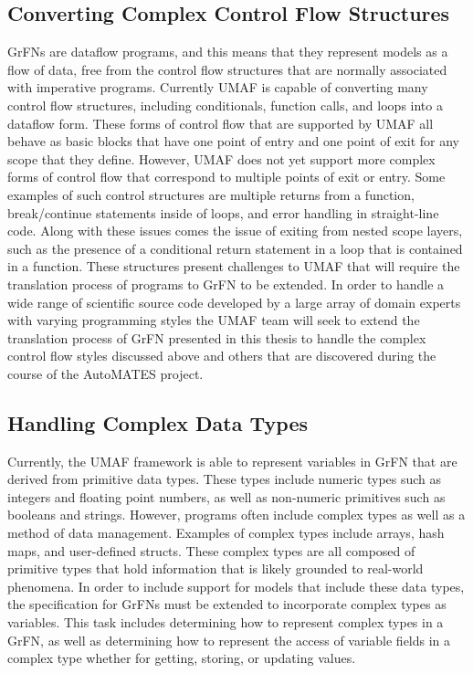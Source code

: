 \subsection{Converting Complex Control Flow Structures\label{sec:early_exit}}
GrFNs are dataflow programs, and this means that they represent models as a flow of data, free from the control flow structures that are normally associated with imperative programs.
Currently UMAF is capable of converting many control flow structures, including conditionals, function calls, and loops into a dataflow form.
These forms of control flow that are supported by UMAF all behave as basic blocks that have one point of entry and one point of exit for any scope that they define.
However, UMAF does not yet support more complex forms of control flow that correspond to multiple points of exit or entry.
Some examples of such control structures are multiple returns from a function, break/continue statements inside of loops, and error handling in straight-line code.
Along with these issues comes the issue of exiting from nested scope layers, such as the presence of a conditional return statement in a loop that is contained in a function.
These structures present challenges to UMAF that will require the translation process of programs to GrFN to be extended.
In order to handle a wide range of scientific source code developed by a large array of domain experts with varying programming styles the UMAF team will seek to extend the translation process of GrFN presented in this thesis to handle the complex control flow styles discussed above and others that are discovered during the course of the AutoMATES project.

\subsection{Handling Complex Data Types \label{sec:complex_types}}
Currently, the UMAF framework is able to represent variables in GrFN that are derived from primitive data types.
These types include numeric types such as integers and floating point numbers, as well as non-numeric primitives such as booleans and strings.
However, programs often include complex types as well as a method of data management.
Examples of complex types include arrays, hash maps, and user-defined structs.
These complex types are all composed of primitive types that hold information that is likely grounded to real-world phenomena.
In order to include support for models that include these data types, the specification for GrFNs must be extended to incorporate complex types as variables.
This task includes determining how to represent complex types in a GrFN, as well as determining how to represent the access of variable fields in a complex type whether for getting, storing, or updating values.

